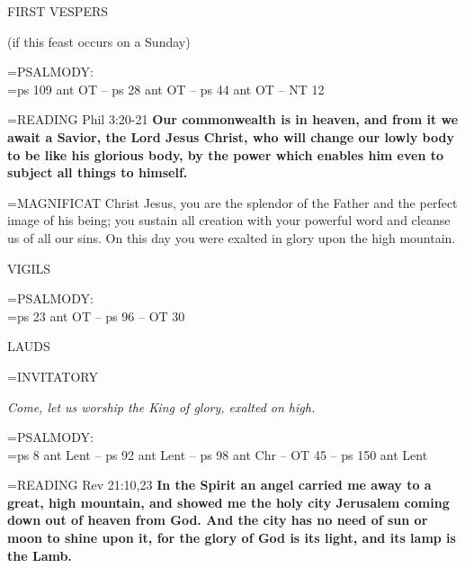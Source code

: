 \begin{flushleft}\normalsize FIRST VESPERS\\\end{flushleft} (if this feast occurs on a Sunday)

\hangindent=\parindent \small{PSALMODY:}\\
\hangindent=\parindent  ps 109 ant OT -- ps 28 ant OT -- ps 44 ant OT -- NT 12\vspace{0.5em}

\hangindent=\parindent \small{READING} Phil 3:20-21 \textbf{Our commonwealth is in heaven, and from it we
await a Savior, the Lord Jesus Christ, who will change our lowly body to
be like his glorious body, by the power which enables him even to subject
all things to himself.\\}
 
\hangindent=\parindent \small{MAGNIFICAT  Christ Jesus, you are the splendor of the Father and the
perfect image of his being; you sustain all creation with your powerful
word and cleanse us of all our sins. On this day you were exalted in
glory upon the high mountain.\\}
 
\begin{flushleft}\normalsize VIGILS\\\end{flushleft}

\hangindent=\parindent \small{PSALMODY:}\\
\hangindent=\parindent  ps 23 ant OT -- ps 96 -- OT 30\vspace{0.5em}

\begin{flushleft}\normalsize LAUDS\\\end{flushleft}

\hangindent=\parindent \small{INVITATORY}
\begin{center}
\textit{Come, let us worship the King of glory, exalted on high.\\}
\end{center}

\hangindent=\parindent \small{PSALMODY:}\\
\hangindent=\parindent  ps 8 ant Lent -- ps 92 ant Lent -- ps 98 ant Chr -- OT 45 -- ps 150 ant Lent\vspace{0.5em}

\hangindent=\parindent \small{READING} Rev 21:10,23 \textbf{In the Spirit an angel carried me away to a
great, high mountain, and showed me the holy city Jerusalem
coming down out of heaven from God. And the city has no need of
sun or moon to shine upon it, for the glory of God is its light, and
its lamp is the Lamb.\\}
 
